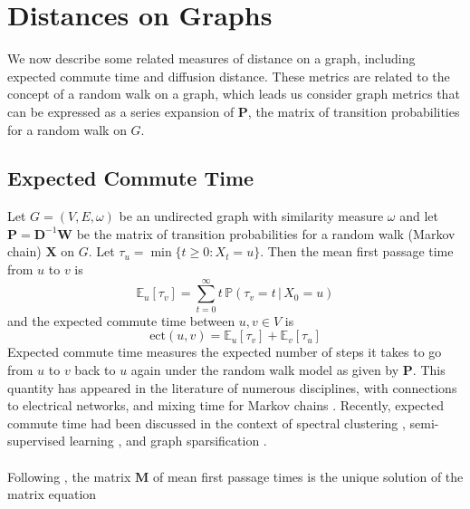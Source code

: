 \documentclass[10pt,twocolumn]{article}
\numberwithin{equation}{section}
\begin{document}
\section{Distances on Graphs}
\label{sec:distances-graphs}
We now describe
some related measures of distance on a graph, including
expected commute time and diffusion distance. 
These metrics are related to the concept of a random
walk on a graph, which leads us consider graph metrics
that can be expressed as a series expansion of $\mathbf{P}$,
the matrix of transition probabilities for a random walk on $G$.


\subsection{Expected Commute Time}
\label{sec:expect-comm-time}
Let $G = (V,E,\omega)$ be an undirected graph with similarity measure
$\omega$ and let 
$\mathbf{P} = \mathbf{D}^{-1}\mathbf{W}$
be the matrix of transition probabilities for a random walk 
(Markov chain) $\mathbf{X}$ on $G$.
Let $\tau_u = \min\{ t \geq 0 \colon X_t = u \}$.
Then the mean first passage time from $u$ to $v$ is
\begin{equation}
  \label{eq:6}
  \mathbb{E}_{u}[\tau_v] = \sum_{t = 0}^{\infty}{t \, \mathbb{P}(\tau_v =
    t \,|\, X_0 = u)}
\end{equation}
and the expected commute time between $u,v \in V$ is
\begin{equation}
  \label{eq:5}
  \mathrm{ect}(u,v) = \mathbb{E}_{u}[\tau_v] + \mathbb{E}_{v}[\tau_u] 
\end{equation}
Expected commute time measures the expected number
of steps it takes to go from $u$ to $v$ back to $u$ again under the
random walk model as given by $\mathbf{P}$. This quantity has
 appeared in the literature of numerous disciplines, with
connections to electrical networks,
\cite{doyle84:_random_walks_elect_networ} and mixing time for Markov
chains
\cite{lovasz96:_random_graph,levin09:_markov_chain_mixin_times}.
Recently, expected commute time had been discussed in the context of
spectral clustering
\cite{saerens04,yen07:_graph,qui07:_clust}, semi-supervised learning
\cite{szummer01:_partial_markov,zhou04:_learn,zhou04:_learn_label_unlab,zhu03:_semi_super_learn_using_gauss},
and graph sparsification \cite{spielmand08:_graph}. \\ \\
\noindent
Following \cite{kemeny83:_finit_markov_chain}, the matrix
$\mathbf{M}$ of mean first passage times is 
the unique solution of the matrix equation
\end{document}
